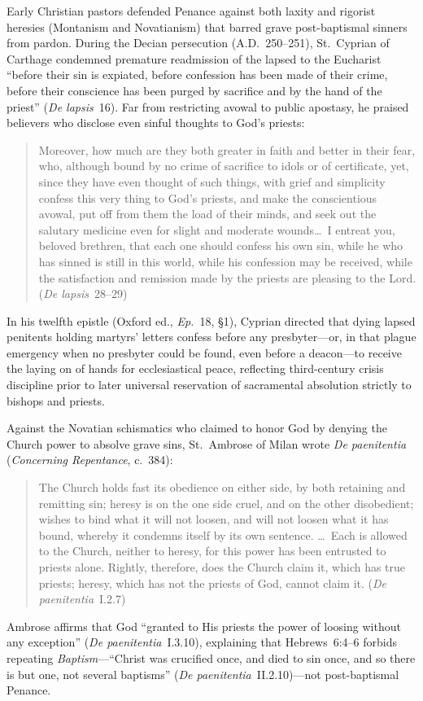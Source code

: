 Early Christian pastors defended Penance against both laxity and rigorist heresies (Montanism and Novatianism) that barred grave post-baptismal sinners from pardon. During the Decian persecution (A.D.~250--251), St.~Cyprian of Carthage condemned premature readmission of the lapsed to the Eucharist ``before their sin is expiated, before confession has been made of their crime, before their conscience has been purged by sacrifice and by the hand of the priest'' (\emph{De lapsis}~16). Far from restricting avowal to public apostasy, he praised believers who disclose even sinful thoughts to God's priests:
\begin{quotation}
Moreover, how much are they both greater in faith and better in their fear, who, although bound by no crime of sacrifice to idols or of certificate, yet, since they have even thought of such things, with grief and simplicity confess this very thing to God's priests, and make the conscientious avowal, put off from them the load of their minds, and seek out the salutary medicine even for slight and moderate wounds\ldots\ I entreat you, beloved brethren, that each one should confess his own sin, while he who has sinned is still in this world, while his confession may be received, while the satisfaction and remission made by the priests are pleasing to the Lord. (\emph{De lapsis}~28--29)
\end{quotation}
In his twelfth epistle (Oxford ed., \emph{Ep.}~18, \S1), Cyprian directed that dying lapsed penitents holding martyrs' letters confess before any presbyter---or, in that plague emergency when no presbyter could be found, even before a deacon---to receive the laying on of hands for ecclesiastical peace, reflecting third-century crisis discipline prior to later universal reservation of sacramental absolution strictly to bishops and priests.

Against the Novatian schismatics who claimed to honor God by denying the Church power to absolve grave sins, St.~Ambrose of Milan wrote \emph{De paenitentia} (\emph{Concerning Repentance}, c.~384):
\begin{quotation}
The Church holds fast its obedience on either side, by both retaining and remitting sin; heresy is on the one side cruel, and on the other disobedient; wishes to bind what it will not loosen, and will not loosen what it has bound, whereby it condemns itself by its own sentence. \ldots\ Each is allowed to the Church, neither to heresy, for this power has been entrusted to priests alone. Rightly, therefore, does the Church claim it, which has true priests; heresy, which has not the priests of God, cannot claim it. (\emph{De paenitentia}~I.2.7)
\end{quotation}
Ambrose affirms that God ``granted to His priests the power of loosing without any exception'' (\emph{De paenitentia}~I.3.10), explaining that Hebrews~6:4--6 forbids repeating \emph{Baptism}---``Christ was crucified once, and died to sin once, and so there is but one, not several baptisms'' (\emph{De paenitentia}~II.2.10)---not post-baptismal Penance.

